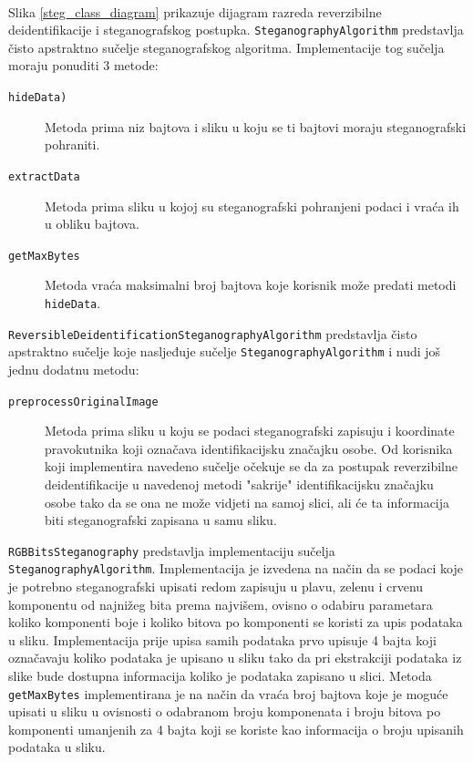 \documentclass[times, utf8, seminar, numeric]{fer}
\begin{document}
\paragraph{}
Slika \ref{steg_class_diagram} prikazuje dijagram razreda reverzibilne deidentifikacije i steganografskog postupka. \texttt{SteganographyAlgorithm} predstavlja čisto apstraktno sučelje steganografskog algoritma. Implementacije tog sučelja moraju ponuditi 3 metode:
\begin{description}
\item[\texttt{hideData)}] Metoda prima niz bajtova i sliku u koju se ti bajtovi moraju steganografski pohraniti.
\item[\texttt{extractData}] Metoda prima sliku u kojoj su steganografski pohranjeni podaci i vraća ih u obliku bajtova.
\item[\texttt{getMaxBytes}] Metoda vraća maksimalni broj bajtova koje korisnik može predati metodi \texttt{hideData}.
\end{description}

\texttt{ReversibleDeidentificationSteganographyAlgorithm} predstavlja čisto apstraktno sučelje koje nasljeđuje sučelje \texttt{SteganographyAlgorithm} i nudi još jednu dodatnu metodu:
\begin{description}
\item[\texttt{preprocessOriginalImage}] Metoda prima sliku u koju se podaci steganografski zapisuju i koordinate pravokutnika koji označava identifikacijsku značajku osobe. Od korisnika koji implementira navedeno sučelje očekuje se da za postupak reverzibilne deidentifikacije u navedenoj metodi "sakrije" identifikacijsku značajku osobe tako da se ona ne može vidjeti na samoj slici, ali će ta informacija biti steganografski zapisana u samu sliku.
\end{description}

\texttt{RGBBitsSteganography} predstavlja implementaciju sučelja \texttt{SteganographyAlgorithm}. Implementacija je izvedena na način da se podaci koje je potrebno steganografski upisati redom zapisuju u plavu, zelenu i crvenu komponentu od najnižeg bita prema najvišem, ovisno o odabiru parametara koliko komponenti boje i koliko bitova po komponenti se koristi za upis podataka u sliku. Implementacija prije upisa samih podataka prvo upisuje 4 bajta koji označavaju koliko podataka je upisano u sliku tako da pri ekstrakciji podataka iz slike bude dostupna informacija koliko je podataka zapisano u slici. Metoda \texttt{getMaxBytes} implementirana je na način da vraća broj bajtova koje je moguće upisati u sliku u ovisnosti o odabranom broju komponenata i broju bitova po komponenti umanjenih za 4 bajta koji se koriste kao informacija o broju upisanih podataka u sliku.
\end{document}
